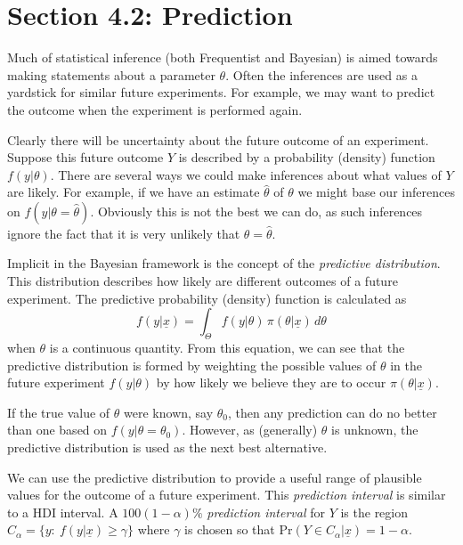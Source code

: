 \section{Section 4.2: Prediction}
Much of statistical inference (both Frequentist and Bayesian) is aimed towards making statements about a parameter $\theta$. Often the inferences are used as a yardstick for similar future experiments. For example, we may want to predict the outcome when the experiment is performed again.

Clearly there will be uncertainty about the future outcome of an experiment. Suppose this future outcome $Y$ is described by a probability (density) function $f(y|\theta)$. There are several ways we could make inferences about what values of $Y$ are likely. For example, if we have an estimate $\hat{\theta}$ of $\theta$ we might base our inferences on $f(y|\theta=\hat{\theta})$. Obviously this is not the best we can do, as such inferences ignore the fact that it is very unlikely that $\theta=\hat{\theta}$. 

Implicit in the Bayesian framework is the concept of the {\it predictive distribution}. This distribution describes how likely are different outcomes of a future experiment. The predictive probability (density) function is calculated as
\begin{equation*}
f(y|\underline{x})=\int_\Theta
f(y|\theta)\,\pi(\theta|\underline{x})\,d\theta
\end{equation*}
when $\theta$ is a continuous quantity. From this equation, we can see that the predictive distribution is formed by weighting the possible values of $\theta$ in the future experiment $f(y|\theta)$ by how likely we believe they are to occur $\pi(\theta|\underline{x})$.

If the true value of $\theta$ were known, say $\theta_0$, then any prediction can do no better than one based on $f(y|\theta=\theta_0)$. However, as (generally) $\theta$ is unknown, the predictive distribution is used as the next best alternative.

We can use the predictive distribution to provide a useful range of plausible values for the outcome of a future experiment. This \emph{prediction interval} is similar to a HDI interval. A $100(1-\alpha)\%$ \emph{prediction interval} for $Y$ is the region $C_\alpha=\{y:~f(y|\underline{x})\geq\gamma\}$ where $\gamma$ is chosen so that $\text{Pr}(Y\in C_\alpha|\underline{x})=1-\alpha$.

